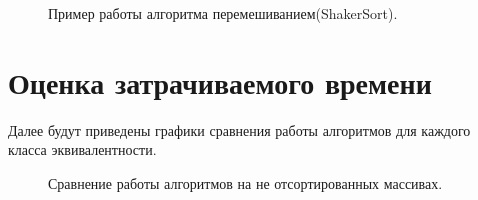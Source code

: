 \documentclass[12pt,a4paper]{report}
\begin{document}
\begin{figure}[ht]
	\caption{Пример работы алгоритма перемешиванием(ShakerSort).}
	\label{fig:image}
\end{figure}



\newpage
\section{Оценка затрачиваемого времени}

Далее будут приведены графики сравнения работы алгоритмов для каждого класса эквивалентности.


\begin{figure}[ht!]
	\caption{Сравнение работы алгоритмов на не отсортированных массивах.}
	\label{fig:image}
\end{figure}
\end{document}
